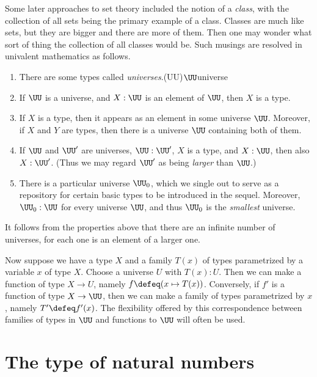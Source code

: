 Some later approaches to
  set theory included the notion of a \emph{class}, with the collection of all sets being the primary example of a class.  Classes are much like
  sets, but they are bigger and there are more of them.  Then one may wonder what sort of thing the collection of all classes would be.  Such
  musings are resolved in univalent mathematics as follows.

\begin{enumerate}
  \item There are some types called \emph{universes}.\glossary(UU){$\protect\UU$}{universe}
  \item If $\UU$ is a universe, and $X : \UU$ is an element of $\UU$, then $X$ is a type.
  \item If $X$ is a type, then it appears as an element in some universe $\UU$.
    Moreover, if $X$ and $Y$ are types, then there is a universe $\UU$ containing both of them.
  \item If $\UU$ and $\UU'$ are universes, $\UU:\UU'$, $X$ is a type, and $X:\UU$, then also $X:\UU'$.  (Thus we may regard $\UU'$ as being \emph{larger} than $\UU$.)
  \item There is a particular universe $\UU_0$, which we single out to serve as a repository for certain basic types to be introduced in the sequel.
    Moreover, $\UU_0 : \UU$ for every universe $\UU$, and thus $\UU_0$ is the \emph{smallest} universe.
\end{enumerate}

It follows from the properties above that there are an infinite number of universes, for each one is an element of a larger one.

Now suppose we have a type $X$ and a family $T(x)$ of types parametrized by a variable $x$ of type $X$.  Choose a universe $U$ with $T(x) : U$.
Then we can make a function of type $X \to U$, namely $f \defeq (x \mapsto T(x))$.  Conversely, if $f'$ is a function of type $X \to \UU$, then
we can make a family of types parametrized by $x$, namely $T' \defeq f'(x)$.  The flexibility offered by this correspondence between families of
types in $\UU$ and functions to $\UU$ will often be used.

\section{The type of natural numbers}
\label{sec:natural-numbers}

